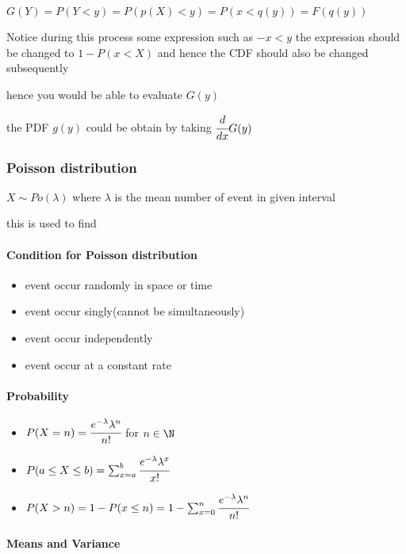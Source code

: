 \documentclass[]{article}
\let\oldparagraph\paragraph
\renewcommand{\paragraph}[1]{\oldparagraph{#1}\mbox{}}
\begin{document}
\(G(Y) = P(Y<y) = P(p(X)<y) = P(x<q(y)) = F(q(y))\)

Notice during this process some expression such as \(-x<y\) the
expression should be changed to \(1-P(x<X)\) and hence the CDF should
also be changed subsequently

hence you would be able to evaluate \(G(y)\)

the PDF \(g(y)\) could be obtain by taking \(\cfrac{d}{dx} G(y)\)

\subsubsection{Poisson distribution}\label{header-n43}

\(X\sim Po(\lambda)\) where \(\lambda\) is the mean number of event in
given interval

this is used to find

\paragraph{Condition for Poisson distribution}\label{header-n45}

\begin{itemize}
\item
  event occur randomly in space or time
\item
  event occur singly(cannot be simultaneously)
\item
  event occur independently
\item
  event occur at a constant rate
\end{itemize}

\paragraph{Probability}\label{header-n55}

\begin{itemize}
\item
  \( P(X = n) = \cfrac{e^{-\lambda} \lambda^n}{n!}\) for \(n \in \N\)
\item
  \(P(a \le X \le b) = \sum^b_{x = a}\cfrac{e^{-\lambda} \lambda^x}{x!}\)
\item
  \(P(X>n) = 1-P(x\le n) = 1-\sum^n_{x=0}\cfrac{e^{-\lambda} \lambda^n}{n!} \)
\end{itemize}

\paragraph{Means and Variance}\label{header-n63}
\end{document}
